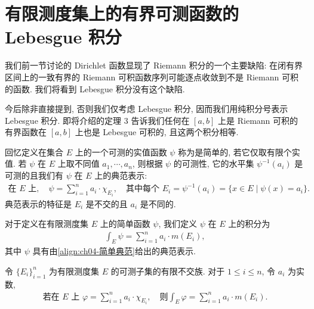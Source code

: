 \documentclass[../../main.tex]{subfiles}
\begin{document}
\section{有限测度集上的有界可测函数的 Lebesgue 积分}\label{section:ch04-有界可测积分}

我们前一节讨论的 Dirichlet 函数显现了 Riemann 积分的一个主要缺陷: 在闭有界区间上的一致有界的 Riemann 可积函数序列可能逐点收敛到不是 Riemann 可积的函数. 我们将看到 Lebesgue 积分没有这个缺陷.

今后除非直接提到, 否则我们仅考虑 Lebesgue 积分, 因而我们用纯积分号表示 Lebesgue 积分. 即将介绍的定理 3 告诉我们任何在 $[a,b]$ 上是 Riemann 可积的有界函数在 $[a,b]$ 上也是 Lebesgue 可积的, 且这两个积分相等.

回忆定义在集合 $E$ 上的一个可测的实值函数 $\psi$ 称为是简单的, 若它仅取有限个实值. 若 $\psi$ 在 $E$ 上取不同值 $a_{1},\cdots,a_{n}$, 则根据 $\psi$ 的可测性, 它的水平集 $\psi^{-1}(a_{i})$ 是可测的且我们有 $\psi$ 在 $E$ 上的典范表示:
\begin{align}
\text{在 }E\text{ 上},\quad\psi=\sum_{i=1}^{n}a_{i}\cdot\chi_{E_{i}},\quad\text{其中每个 }E_{i}=\psi^{-1}(a_{i})=\{x\in E\mid\psi(x)=a_{i}\}.\label{align:ch04-简单典范}
\end{align}
典范表示的特征是 $E_{i}$ 是不交的且 $a_{i}$ 是不同的.

\begin{definition}[简单函数的积分]\label{definition:ch04-简单积分}
对于定义在有限测度集 $E$ 上的简单函数 $\psi$, 我们定义 $\psi$ 在 $E$ 上的积分为
\begin{align*}
\int_{E}\psi=\sum_{i=1}^{n}a_{i}\cdot m(E_{i}),
\end{align*}
其中 $\psi$ 具有由\eqref{align:ch04-简单典范}给出的典范表示.
\end{definition}

\begin{lemma}\label{lemma:ch04-简单积分良定}
令 $\{E_{i}\}_{i=1}^{n}$ 为有限测度集 $E$ 的可测子集的有限不交族. 对于 $1\leqslant i\leqslant n$, 令 $a_{i}$ 为实数,
\begin{align*}
\text{若在 }E\text{ 上 }\varphi=\sum_{i=1}^{n}a_{i}\cdot\chi_{E_{i}},\quad\text{则}\int_{E}\varphi=\sum_{i=1}^{n}a_{i}\cdot m(E_{i}).
\end{align*}
\end{lemma}
\end{document}
